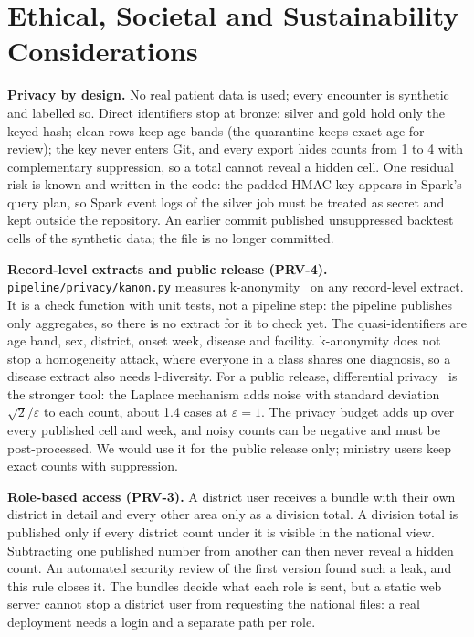 \section{Ethical, Societal and Sustainability Considerations}
\textbf{Privacy by design.} No real patient data is used; every encounter is synthetic and labelled so.
Direct identifiers stop at bronze: silver and gold hold only the keyed hash; clean rows keep age bands (the quarantine keeps exact age for review); the key never enters
Git, and every export hides counts from 1 to 4 with complementary suppression, so a total cannot reveal a hidden
cell. One residual risk is known and written in the code: the padded HMAC key appears in Spark's query plan, so
Spark event logs of the silver job must be treated as secret and kept outside the repository. An earlier commit
published unsuppressed backtest cells of the synthetic data; the file is no longer committed.

\textbf{Record-level extracts and public release (PRV-4).} \texttt{pipeline/privacy/kanon.py} measures
k-anonymity~\cite{sweeney2002k} on any record-level extract. It is a check function with unit tests, not a pipeline step: the pipeline publishes only aggregates, so there is no extract for it to check yet. The quasi-identifiers are age band, sex,
district, onset week, disease and facility. k-anonymity does not stop a homogeneity attack, where everyone in a class
shares one diagnosis, so a disease extract also needs l-diversity. For a public release, differential
privacy~\cite{dwork2006dp} is the stronger tool: the Laplace mechanism adds noise with standard deviation
$\sqrt{2}/\varepsilon$ to each count, about 1.4 cases at $\varepsilon=1$. The privacy budget adds up over every
published cell and week, and noisy counts can be negative and must be post-processed. We would use it for the
public release only; ministry users keep exact counts with suppression.

\textbf{Role-based access (PRV-3).} A district user receives a bundle with their own district in detail and
every other area only as a division total. A division total is published only if every district count under
it is visible in the national view. Subtracting one published number from another can then never reveal a
hidden count. An automated security review of the first version found such a leak, and this rule
closes it. The
bundles decide what each role is sent, but a static web server cannot stop a district user from requesting the
national files: a real deployment needs a login and a separate path per role.

